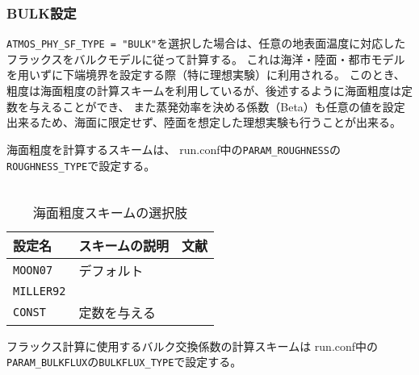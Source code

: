 \subsubsection{BULK設定}
\verb|ATMOS_PHY_SF_TYPE = "BULK"|を選択した場合は、任意の地表面温度に対応したフラックスをバルクモデルに従って計算する。
これは海洋・陸面・都市モデルを用いずに下端境界を設定する際（特に理想実験）に利用される。
このとき、粗度は海面粗度の計算スキームを利用しているが、後述するように海面粗度は定数を与えることができ、
また蒸発効率を決める係数（Beta）も任意の値を設定出来るため、海面に限定せず、陸面を想定した理想実験も行うことが出来る。

海面粗度を計算するスキームは、
run.conf中の\verb|PARAM_ROUGHNESS|の\verb|ROUGHNESS_TYPE|で設定する。\\

\\

\begin{table}[h]
\begin{center}
  \caption{海面粗度スキームの選択肢}
  \label{tab:nml_roughness}
  \begin{tabularx}{150mm}{llX} \hline
    \rowcolor[gray]{0.9}  設定名 & スキームの説明 & 文献 \\ \hline
      \verb|MOON07|   & デフォルト & \citet{moon_2007} \\
      \verb|MILLER92| &            & \citet{miller_1992} \\
      \verb|CONST|    & 定数を与える & \\
    \hline
  \end{tabularx}
\end{center}
\end{table}

フラックス計算に使用するバルク交換係数の計算スキームは
run.conf中の\verb|PARAM_BULKFLUX|の\verb|BULKFLUX_TYPE|で設定する。\\

\\

